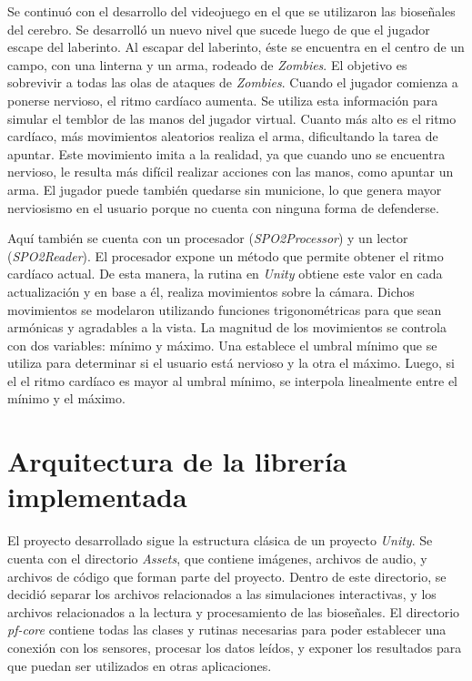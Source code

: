 Se continuó con el desarrollo del videojuego en el que se utilizaron las bioseñales del cerebro. Se desarrolló un nuevo nivel que sucede luego de que el jugador escape del laberinto. Al escapar del laberinto, éste se encuentra en el centro de un campo,  con una linterna y un arma, rodeado de \emph{Zombies}. El objetivo es sobrevivir a todas las olas de ataques de \emph{Zombies}. Cuando el jugador comienza a ponerse nervioso, el ritmo cardíaco aumenta. Se utiliza esta información para simular el temblor de las manos del jugador virtual. Cuanto más alto es el ritmo cardíaco, más movimientos aleatorios realiza el arma, dificultando la tarea de apuntar. Este movimiento imita a la realidad, ya que cuando uno se encuentra nervioso, le resulta más difícil realizar acciones con las manos, como apuntar un arma. El jugador puede también quedarse sin municione, lo que genera mayor nerviosismo en el usuario porque no cuenta con ninguna forma de defenderse.

Aquí también se cuenta con un procesador (\emph{SPO2Processor}) y un lector (\emph{SPO2Reader}). El procesador expone un método que permite obtener el ritmo cardíaco actual. De esta manera, la rutina en \emph{Unity} obtiene este valor en cada actualización y en base a él, realiza movimientos sobre la cámara. Dichos movimientos se modelaron utilizando funciones trigonométricas para que sean armónicas y agradables a la vista. La magnitud de los movimientos se controla con dos variables: mínimo y máximo. Una establece el umbral mínimo que se utiliza para determinar si el usuario está nervioso y la otra el máximo. Luego, si el el ritmo cardíaco es mayor al umbral mínimo, se interpola linealmente entre el mínimo y el máximo.

\section{Arquitectura de la librería implementada}

El proyecto desarrollado sigue la estructura clásica de un proyecto \emph{Unity}. Se cuenta con el directorio \emph{Assets}, que contiene imágenes, archivos de audio, y archivos de código que forman parte del proyecto. Dentro de este directorio, se decidió separar los archivos relacionados a las simulaciones interactivas, y los archivos relacionados a la lectura y procesamiento de las bioseñales. El directorio \emph{pf-core} contiene todas las clases y rutinas necesarias para poder establecer una conexión con los sensores, procesar los datos leídos, y exponer los resultados para que puedan ser utilizados en otras aplicaciones.


